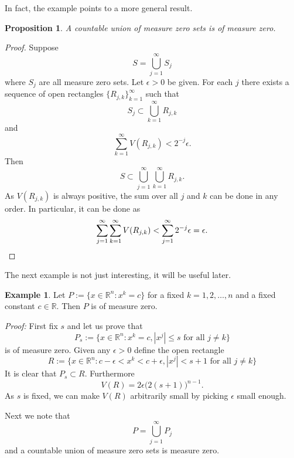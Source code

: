 \documentclass[12pt]{book}
\newcommand{\abs}[1]{\left\lvert {#1} \right\rvert}
\newcommand{\R}{{\mathbb{R}}}
\theoremstyle{plain}
\newtheorem{prop}[thm]{Proposition}
\theoremstyle{remark}
\theoremstyle{definition}
\theoremstyle{exercise}
\theoremstyle{example}
\newtheorem{example}[thm]{Example}
\begin{document}
In fact, the example points to a more general result.

\begin{prop}
A countable union of measure zero sets is of measure zero.
\end{prop}

\begin{proof}
Suppose
\begin{equation*}
S = \bigcup_{j=1}^\infty S_j
\end{equation*}
where $S_j$ are all measure zero sets.  Let $\epsilon > 0$ be given.
For each $j$
there exists a sequence of open rectangles $\{ R_{j,k} \}_{k=1}^\infty$
such that
\begin{equation*}
S_j \subset \bigcup_{k=1}^\infty R_{j,k}
\end{equation*}
and 
\begin{equation*}
\sum_{k=1}^\infty V(R_{j,k}) < 2^{-j} \epsilon .
\end{equation*}
Then
\begin{equation*}
S \subset \bigcup_{j=1}^\infty \bigcup_{k=1}^\infty R_{j,k} .
\end{equation*}
As $V(R_{j,k})$ is always positive, the sum over all $j$ and $k$
can be done in any order.  In particular, it can be done as
\begin{equation*}
\sum_{j=1}^\infty \sum_{k=1}^\infty V(R_{j,k}) <
\sum_{j=1}^\infty 2^{-j} \epsilon = \epsilon . \qedhere
\end{equation*}
\end{proof}

The next example is not just interesting, it will be useful later.

\begin{example} \label{mv:example:planenull}
Let $P := \{ x \in \R^n : x^k = c \}$ for a fixed $k=1,2,\ldots,n$ and
a fixed constant $c \in \R$.  Then $P$ is of measure zero.

\emph{Proof:}
First fix $s$ and let us prove that
\begin{equation*}
P_s := \{ x \in \R^n : x^k = c, \abs{x^j} \leq s \text{ for all $j\not=k$} \}
\end{equation*}
is of measure zero.
Given any $\epsilon > 0$ define the open rectangle
\begin{equation*}
R := \{ x \in \R^n : c-\epsilon < x^k < c+\epsilon, \abs{x^j} < s+1 \text{ for all $j\not=k$} \}
\end{equation*}
It is clear that $P_s \subset R$.  Furthermore
\begin{equation*}
V(R) = 2\epsilon {\bigl(2(s+1)\bigr)}^{n-1} .
\end{equation*}
As $s$ is fixed, we can
make $V(R)$
arbitrarily small by
picking $\epsilon$ small enough.

Next we note that
\begin{equation*}
P = \bigcup_{j=1}^\infty P_j
\end{equation*}
and a countable union of measure zero sets is measure zero.
\end{example}
\end{document}
